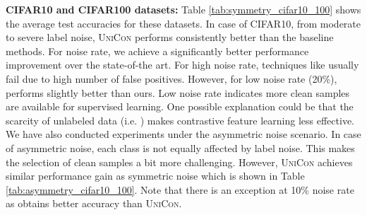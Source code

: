 \documentclass[10pt,twocolumn,letterpaper]{article}
\begin{document}
\textbf{CIFAR10 and CIFAR100 datasets:}  Table \ref{tab:symmetry_cifar10_100} shows the average test accuracies for these datasets. In case of CIFAR10, from moderate to severe label noise, \textsc{UniCon} performs consistently better than the baseline methods. 
For  noise rate, we achieve a significantly better performance improvement over the state-of-the art. For high noise rate, techniques like \cite{li2020dividemix} usually fail due to high number of false positives. 
However, for low noise rate (20\%), \cite{li2020dividemix} performs slightly better than ours. Low noise rate indicates more clean samples are available for supervised learning. One possible explanation could be that the scarcity of unlabeled data (i.e. ) makes contrastive feature learning less effective.  We have also conducted experiments under the asymmetric noise scenario. In case of asymmetric noise, each class is not equally affected by label noise. This makes the selection of clean samples a bit more challenging. However, \textsc{UniCon} achieves similar performance gain as symmetric noise which is shown in Table \ref{tab:asymmetry_cifar10_100}. Note that there is an exception at 10\% noise rate as \cite{liu2020earlylearning} obtains  better accuracy than \textsc{UniCon}. 
\end{document}
